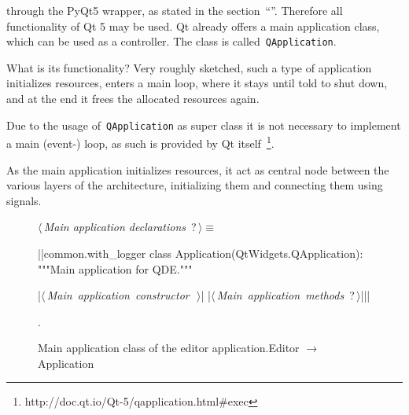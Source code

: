 \documentclass[%
    a4paper,    %
    justified,  %
    nobib,      %
    openany     %
]{tufte-book}
\begin{document}
 through the PyQt5 wrapper, as stated in the
section~\enquote{}. Therefore all
functionality of Qt 5 may be used. Qt already offers a main application class,
which can be used as a controller. The class is called~\verb+QApplication+.

 What is
its functionality? Very roughly sketched, such a type of application initializes
resources, enters a main loop, where it stays until told to shut down, and at
the end it frees the allocated resources again.

Due to the usage of~\verb+QApplication+ as super class it is not necessary to
implement a main (event-) loop, as such is provided by Qt
itself~\footnote{http://doc.qt.io/Qt-5/qapplication.html\#exec}.

As the main application initializes resources, it act as central node between the
various layers of the architecture, initializing them and connecting them using
signals.\cite[pp. 37 --- 38]{osterwalder-qde-2016}

\begin{figure}[h]
  \begin{flushleft} \small
\begin{minipage}{\linewidth}\label{scrap12}\raggedright\small
{} $\langle\,${\itshape Main application declarations}\nobreak\ {\footnotesize {?}}$\,\rangle\equiv$
\vspace{-1ex}
\begin{pythoncode}
  |\normalfont{}\fontfamily{}|common.with_logger
  class Application(QtWidgets.QApplication):
      """Main application for QDE."""

      |\hbox{$\langle\,${\itshape Main application constructor}\nobreak\ {\footnotesize {}}$\,\rangle$}|
      |\hbox{$\langle\,${\itshape Main application methods}\nobreak\ {\footnotesize ?}$\,\rangle$}||\NWsep|
\end{pythoncode}
\vspace{1.5ex}
\footnotesize
\begin{list}{}{\setlength{\itemsep}{-\parsep}\setlength{\itemindent}{-\leftmargin}}
\item {\NWtxtMacroNoRef}.

\item{}
\end{list}
\end{minipage}\vspace{4ex}
\end{flushleft}
\caption{Main application class of the editor
    application.\newline{}\newline{}Editor $\rightarrow$ Application}
  \label{editor:lst:app}
\end{figure}
\end{document}
